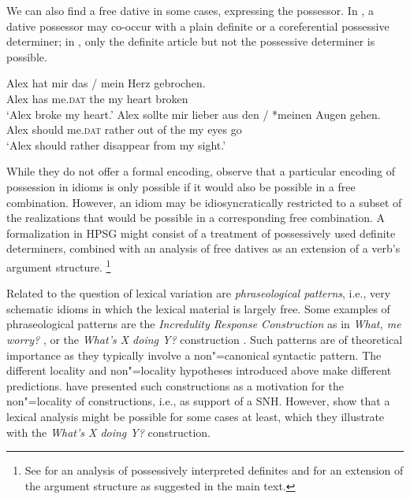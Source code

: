 \documentclass[output=paper
 	        ,biblatex
                ,babelshorthands
                ,newtxmath
                ,draftmode
                ,colorlinks, citecolor=brown
]{langscibook}
\begin{document}
We can also find a free dative in some cases, expressing the possessor.  In , a
dative possessor may co-occur with a plain definite or a coreferential possessive determiner; in
, only the definite article but not the possessive determiner is possible.


\eal
\label{ex-herz-augen}
\ex 
\gll Alex hat mir das / mein Herz gebrochen.\\
Alex has me.\textsc{dat} the {} my heart broken\\
\glt `Alex broke my heart.'\label{ex-herz}
\ex 
\gll Alex sollte mir lieber aus den / *meinen Augen gehen.\\
Alex should me.\textsc{dat} rather {out of} the {} \hphantom{*}my eyes go\\
\glt `Alex should rather disappear from my sight.'\label{ex-augen}
\zl 

\noindent
While they do not offer a formal encoding, \citet{Markantonatou:Sailer:16} observe that a particular
encoding of possession in idioms is only possible if it would also be possible in a free
combination. However, an idiom may be idiosyncratically restricted to a subset of the realizations
that would be possible in a corresponding free combination. A formalization in HPSG might consist of
a treatment of possessively used definite determiners, combined with an analysis of free datives as
an extension of a verb's argument structure.%
\footnote{See  for an analysis of possessively interpreted definites and
   for an extension of the argument structure as suggested in the main
  text.
}

Related to the question of lexical variation are \emph{phraseological
  patterns}, i.e., very schematic idioms in which the lexical material is largely free. Some
examples of phraseological patterns are the \emph{Incredulity Response Construction} as in
\emph{What, me worry?} \citep{Akmajian:84,Lambrecht:90}, or the \emph{What's X doing Y?}
construction \citep{KF99a}.  Such patterns are of theoretical importance as they typically involve a
non"=canonical syntactic pattern.  The different locality and non"=locality hypotheses introduced
above make different predictions.  \citet{FKoC88a} have presented such constructions as a motivation
for the non"=locality of constructions, i.e., as support of a SNH. However, \citet{KF99a} show that
a lexical analysis might be possible for some cases at least, which they illustrate with the
\emph{What's X doing Y?} construction.
\end{document}
